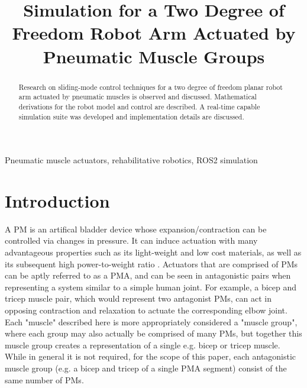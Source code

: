 \documentclass[conference]{IEEEtran}
\begin{document}
	
	\title{Simulation for a Two Degree of Freedom Robot Arm Actuated by Pneumatic Muscle Groups}
	
	\author{
	}
	
	\maketitle
	
	\begin{abstract}
		Research on sliding-mode control techniques for a two degree of freedom planar robot arm actuated by pneumatic muscles is observed and discussed. Mathematical derivations for the robot model and control are described. A real-time capable simulation suite was developed and implementation details are discussed.
	\end{abstract}
	
	\begin{IEEEkeywords}
		Pneumatic muscle actuators, rehabilitative robotics, ROS2 simulation
	\end{IEEEkeywords}
	
	\section{Introduction}

	A \ac{PM} is an artifical bladder device whose expansion/contraction can be controlled via changes in pressure. It can induce actuation with many advantageous properties such as its light-weight and low cost materials, as well as its subsequent high power-to-weight ratio \cite{main-article}. Actuators that are comprised of \acp{PM} can be aptly referred to as a \ac{PMA}, and can be seen in antagonistic pairs when representing a system similar to a simple human joint. For example, a bicep and tricep muscle pair, which would represent two antagonist \acp{PM}, can act in opposing contraction and relaxation to actuate the corresponding elbow joint. Each "muscle" described here is more appropriately considered a "muscle group", where each group may also actually be comprised of many \acp{PM}, but together this muscle group creates a representation of a single e.g. bicep or tricep muscle. While in general it is not required, for the scope of this paper, each antagonistic muscle group (e.g. a bicep and tricep of a single \ac{PMA} segment) consist of the same number of \acp{PM}.
\end{document}
